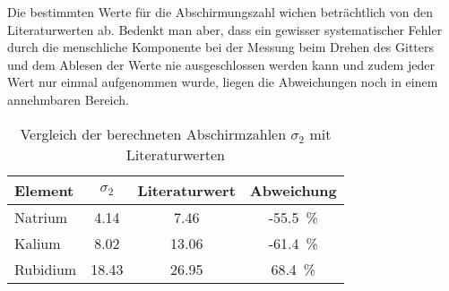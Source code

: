 Die bestimmten Werte für die Abschirmungszahl wichen beträchtlich von den Literaturwerten \cite{deGruyter} ab. Bedenkt man aber, dass ein gewisser systematischer Fehler durch die menschliche Komponente bei der Messung beim Drehen des Gitters und dem Ablesen der Werte nie ausgeschlossen werden kann und zudem jeder Wert nur einmal aufgenommen wurde, liegen die Abweichungen noch in einem annehmbaren Bereich.
\begin{table}[h!]
	\centering
	\caption{Vergleich der berechneten Abschirmzahlen $\sigma_2$ mit Literaturwerten}
	\label{tab:Literatur}
	\begin{tabular}{l|ccc}
		\toprule
		Element & $\sigma_2$ & Literaturwert & Abweichung \\
		\midrule
		Natrium & 4.14 & 7.46 & -\SI{55.5}{\%} \\
		Kalium & 8.02 & 13.06 & -\SI{61.4}{\%} \\
		Rubidium & 18.43 & 26.95 & \SI{68.4}{\%} \\
		\bottomrule
	\end{tabular}
\end{table}

